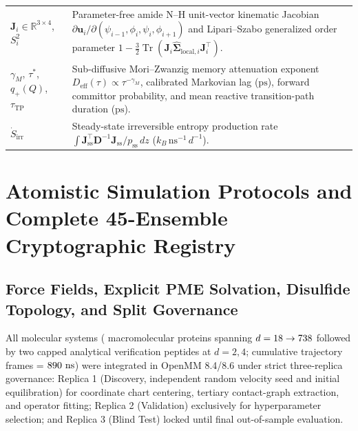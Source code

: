 \documentclass[10pt,letterpaper]{article}
\DeclareMathOperator{\Tr}{Tr}
\begin{document}
\begin{table}[!htbp]
\begin{tabular}{@{}p{} p{}@{}}
$\mathbf{J}_i \in \mathbb{R}^{3\times 4}$, $S^2_i$ & Parameter-free amide N--H unit-vector kinematic Jacobian $\partial\mathbf{u}_i/\partial(\psi_{i-1},\phi_i,\psi_i,\phi_{i+1})$ and Lipari--Szabo generalized order parameter $1 - \frac{3}{2}\Tr(\mathbf{J}_i\hat{\bm{\Sigma}}_{\mathrm{local},i}\mathbf{J}_i^\top)$. \\
$\gamma_M$, $\tau^*$, $q_+(Q)$, $\tau_{\mathrm{TP}}$ & Sub-diffusive Mori--Zwanzig memory attenuation exponent $D_{\mathrm{eff}}(\tau)\propto\tau^{-\gamma_M}$, calibrated Markovian lag ($\text{ps}$), forward committor probability, and mean reactive transition-path duration ($\text{ps}$). \\
$\dot{S}_{\mathrm{irr}}$ & Steady-state irreversible entropy production rate $\int \bm{J}_{\mathrm{ss}}^\top\mathbf{D}^{-1}\bm{J}_{\mathrm{ss}}/p_{\mathrm{ss}}\,dz$ ($k_B\,\text{ns}^{-1}\,d^{-1}$). \\
\bottomrule[1.1pt]
\end{tabular}
\end{table}

\clearpage
\section{Atomistic Simulation Protocols and Complete 45-Ensemble Cryptographic Registry}

\subsection{Force Fields, Explicit PME Solvation, Disulfide Topology, and Split Governance}
All \vFourTotalSystems{} molecular systems (\vFourNumProteins{} macromolecular proteins spanning $d = 18{} \to 738{}$ followed by two capped analytical verification peptides at $d = 2, 4$; cumulative \vFourTotalAtlasFrames{} trajectory frames = $890{}\text{ ns}$) were integrated in OpenMM 8.4/8.6 under strict three-replica governance: Replica 1 (Discovery, independent random velocity seed and initial equilibration) for coordinate chart centering, tertiary contact-graph extraction, and operator fitting; Replica 2 (Validation) exclusively for hyperparameter selection; and Replica 3 (Blind Test) locked until final out-of-sample evaluation.
\end{document}
